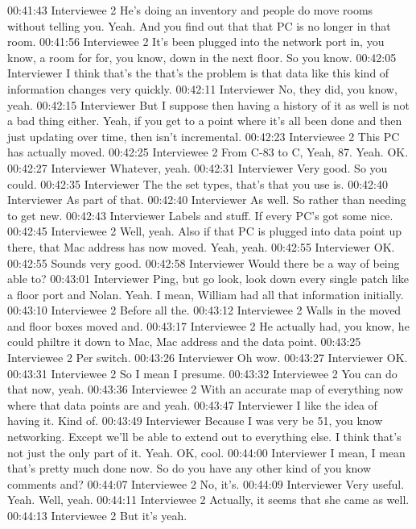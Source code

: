 00:41:43 Interviewee 2 
He's doing an inventory and people do move rooms without telling you. Yeah. And you find out that that PC is no longer in that room.
00:41:56 Interviewee 2 
It's been plugged into the network port in, you know, a room for for, you know, down in the next floor. So you know.
00:42:05 Interviewer
I think that's the that's the problem is that data like this kind of information changes very quickly.
00:42:11 Interviewer
No, they did, you know, yeah.
00:42:15 Interviewer
But I suppose then having a history of it as well is not a bad thing either. Yeah, if you get to a point where it's all been done and then just updating over time, then isn't incremental.
00:42:23 Interviewee 2 
This PC has actually moved.
00:42:25 Interviewee 2 
From C-83 to C, Yeah, 87. Yeah. OK.
00:42:27 Interviewer
Whatever, yeah.
00:42:31 Interviewer
Very good. So you could.
00:42:35 Interviewer
The the set types, that's that you use is.
00:42:40 Interviewer
As part of that.
00:42:40 Interviewer
As well. So rather than needing to get new.
00:42:43 Interviewer
Labels and stuff. If every PC's got some nice.
00:42:45 Interviewee 2 
Well, yeah. Also if that PC is plugged into data point up there, that Mac address has now moved. Yeah, yeah.
00:42:55 Interviewer
OK.
00:42:55
Sounds very good.
00:42:58 Interviewer
Would there be a way of being able to?
00:43:01 Interviewer
Ping, but go look, look down every single patch like a floor port and Nolan. Yeah. I mean, William had all that information initially.
00:43:10 Interviewee 2 
Before all the.
00:43:12 Interviewee 2 
Walls in the moved and floor boxes moved and.
00:43:17 Interviewee 2 
He actually had, you know, he could philtre it down to Mac, Mac address and the data point.
00:43:25 Interviewee 2 
Per switch.
00:43:26 Interviewer
Oh wow.
00:43:27 Interviewer
OK.
00:43:31 Interviewee 2 
So I mean I presume.
00:43:32 Interviewee 2 
You can do that now, yeah.
00:43:36 Interviewee 2 
With an accurate map of everything now where that data points are and yeah.
00:43:47 Interviewer
I like the idea of having it. Kind of.
00:43:49 Interviewer
Because I was very be 51, you know networking. Except we'll be able to extend out to everything else. I think that's not just the only part of it. Yeah. OK, cool.
00:44:00 Interviewer
I mean, I mean that's pretty much done now. So do you have any other kind of you know comments and?
00:44:07 Interviewee 2 
No, it's.
00:44:09 Interviewer
Very useful. Yeah. Well, yeah.
00:44:11 Interviewee 2 
Actually, it seems that she came as well.
00:44:13 Interviewee 2 
But it's yeah.
